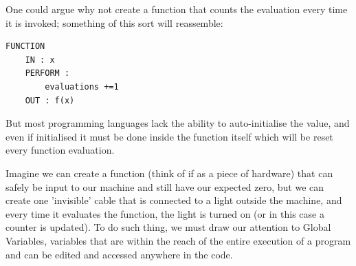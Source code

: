 



One could argue why not create a function that counts the evaluation every time it is invoked; something of this sort will reassemble: 
\begin{lstlisting}
FUNCTION 
    IN : x
    PERFORM : 
        evaluations +=1
    OUT : f(x)
\end{lstlisting}

But most programming languages lack the ability to auto-initialise the value, and even if initialised it must be done inside the function itself which will be reset every function evaluation.

Imagine we can create a function (think of if as a piece of hardware) that can safely be input to our machine and still have our expected zero, but we  can create one 'invisible' cable that is connected to a light outside the machine, and every time it evaluates the function, the light is turned on (or in this case a counter is updated). To do such thing, we must draw our attention to Global Variables, variables that are within the reach of the entire execution of a program and can be edited and accessed anywhere in the code. 

